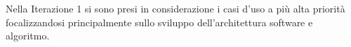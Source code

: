 Nella Iterazione 1 si sono presi in considerazione i casi d'uso a più alta priorità focalizzandosi principalmente sullo sviluppo dell'architettura software e algoritmo.